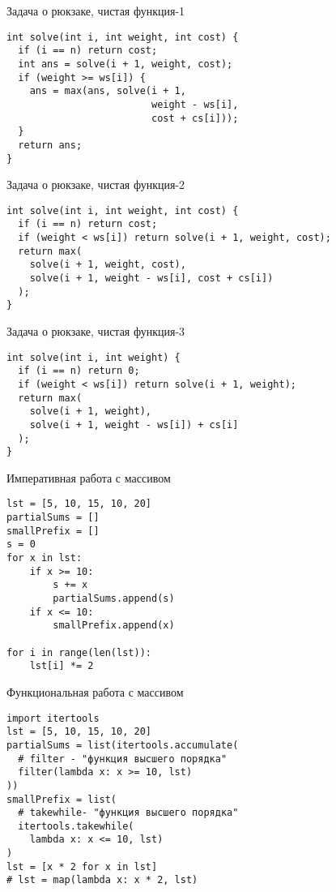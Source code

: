 \begin{frame}[fragile]{Задача о рюкзаке, чистая функция-1}
\begin{verbatim}
int solve(int i, int weight, int cost) {
  if (i == n) return cost;
  int ans = solve(i + 1, weight, cost);
  if (weight >= ws[i]) {
    ans = max(ans, solve(i + 1,
                         weight - ws[i],
                         cost + cs[i]));
  }
  return ans;
}
\end{verbatim}
\end{frame}

\begin{frame}[fragile]{Задача о рюкзаке, чистая функция-2}
\begin{verbatim}
int solve(int i, int weight, int cost) {
  if (i == n) return cost;
  if (weight < ws[i]) return solve(i + 1, weight, cost);
  return max(
    solve(i + 1, weight, cost),
    solve(i + 1, weight - ws[i], cost + cs[i])
  );
}
\end{verbatim}
\end{frame}

\begin{frame}[fragile]{Задача о рюкзаке, чистая функция-3}
\begin{verbatim}
int solve(int i, int weight) {
  if (i == n) return 0;
  if (weight < ws[i]) return solve(i + 1, weight);
  return max(
    solve(i + 1, weight),
    solve(i + 1, weight - ws[i]) + cs[i]
  );
}
\end{verbatim}
\end{frame}

\begin{frame}[fragile]{Императивная работа с массивом}
\begin{verbatim}
lst = [5, 10, 15, 10, 20]
partialSums = []
smallPrefix = []
s = 0
for x in lst:
    if x >= 10:
        s += x
        partialSums.append(s)
    if x <= 10:
        smallPrefix.append(x)

for i in range(len(lst)):
    lst[i] *= 2
\end{verbatim}
\end{frame}

\begin{frame}[fragile]{Функциональная работа с массивом}
\begin{verbatim}
import itertools
lst = [5, 10, 15, 10, 20]
partialSums = list(itertools.accumulate(
  # filter - "функция высшего порядка"
  filter(lambda x: x >= 10, lst)
))
smallPrefix = list(
  # takewhile- "функция высшего порядка"
  itertools.takewhile(
    lambda x: x <= 10, lst)
)
lst = [x * 2 for x in lst]
# lst = map(lambda x: x * 2, lst)
\end{verbatim}
\end{frame}
